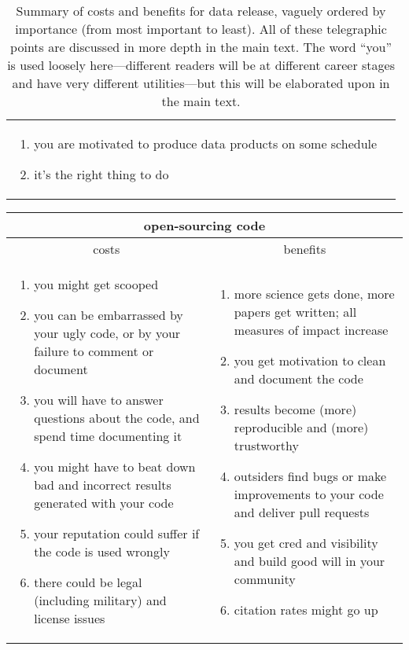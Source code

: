 \documentclass[12pt,twoside,pdftex]{article}
\begin{document}
\begin{table}
\begin{tabular}{@{}p{\cwidth}|p{\cwidth}@{}}
\begin{enumerate}
\item you are motivated to produce data products on some schedule
\item it's the right thing to do
\end{enumerate}\end{tabular}
\caption{Summary of costs and benefits for data release, vaguely
  ordered by importance (from most important to least). All of these
  telegraphic points are discussed in more depth in the main text. The
  word ``you'' is used loosely here---different readers will be at
  different career stages and have very different utilities---but this
  will be elaborated upon in the main text.\label{tab:data}}
\end{table}

\begin{table}%
\begin{tabular}{@{}p{\cwidth}|p{\cwidth}@{}}%
\multicolumn{2}{c}{\textbf{open-sourcing code}} \\ \hline
\multicolumn{1}{c|}{costs} & \multicolumn{1}{c}{benefits} \\ \hline
\begin{enumerate}\raggedright
\item you might get scooped
\item you can be embarrassed by your ugly code, or by your failure to comment or document
\item you will have to answer questions about the code, and spend time documenting it
\item you might have to beat down bad and incorrect results generated with your code
\item your reputation could suffer if the code is used wrongly
\item there could be legal (including military) and license issues
\end{enumerate}&\begin{enumerate}\raggedright
\item more science gets done, more papers get written; all measures of impact increase
\item you get motivation to clean and document the code
\item results become (more) reproducible and (more) trustworthy
\item outsiders find bugs or make improvements to your code and deliver pull requests
\item you get cred and visibility and build good will in your community
\item citation rates might go up

\end{enumerate}
\end{tabular}
\end{table}
\end{document}

